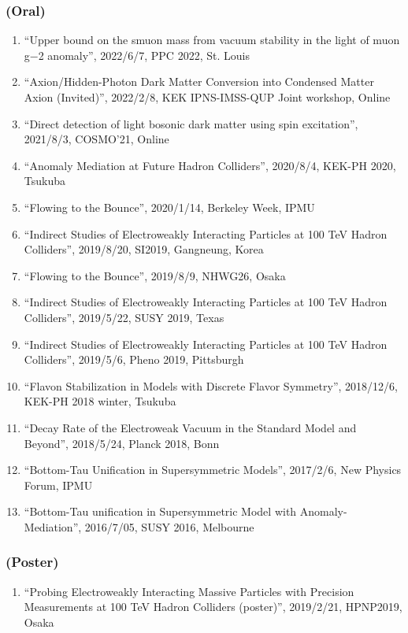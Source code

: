 \documentclass[12pt]{article}
\begin{document}
\subsubsection*{(Oral)}
\begin{enumerate}
 \item ``Upper bound on the smuon mass from vacuum stability in the light of muon g−2 anomaly'', 2022/6/7, PPC 2022, St. Louis
 \item ``Axion/Hidden-Photon Dark Matter Conversion into Condensed Matter Axion (Invited)'', 2022/2/8, KEK IPNS-IMSS-QUP Joint workshop, Online
 \item ``Direct detection of light bosonic dark matter using spin excitation'', 2021/8/3, COSMO'21, Online
 \item ``Anomaly Mediation at Future Hadron Colliders'', 2020/8/4, KEK-PH 2020, Tsukuba
 \item ``Flowing to the Bounce'', 2020/1/14, Berkeley Week, IPMU
 \item ``Indirect Studies of Electroweakly Interacting Particles at 100 TeV Hadron Colliders'', 2019/8/20, SI2019, Gangneung, Korea
 \item ``Flowing to the Bounce'', 2019/8/9, NHWG26, Osaka
 \item ``Indirect Studies of Electroweakly Interacting Particles at 100 TeV Hadron Colliders'', 2019/5/22, SUSY 2019, Texas
 \item ``Indirect Studies of Electroweakly Interacting Particles at 100 TeV Hadron Colliders'', 2019/5/6, Pheno 2019, Pittsburgh
 \item ``Flavon Stabilization in Models with Discrete Flavor Symmetry'', 2018/12/6, KEK-PH 2018 winter, Tsukuba
 \item ``Decay Rate of the Electroweak Vacuum in the Standard Model and Beyond'', 2018/5/24, Planck 2018, Bonn
 \item ``Bottom-Tau Unification in Supersymmetric Models'', 2017/2/6, New Physics Forum, IPMU
 \item ``Bottom-Tau unification in Supersymmetric Model with Anomaly-Mediation'', 2016/7/05, SUSY 2016, Melbourne
\end{enumerate}
\subsubsection*{(Poster)}
\begin{enumerate}
 \item ``Probing Electroweakly Interacting Massive Particles with Precision Measurements at 100 TeV Hadron Colliders (poster)'', 2019/2/21, HPNP2019, Osaka
\end{enumerate}
\end{document}
